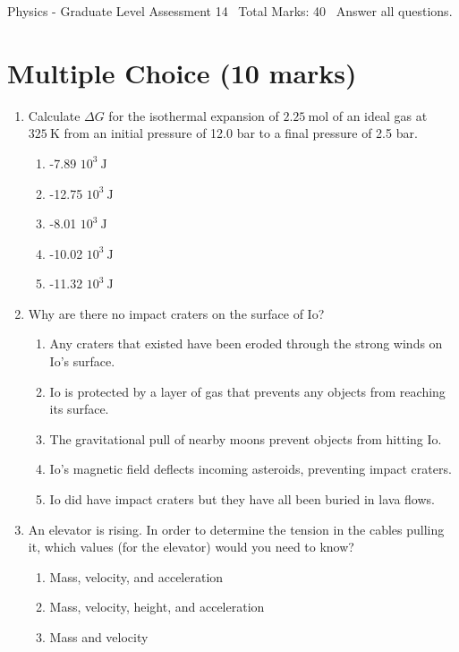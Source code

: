 \documentclass[12pt]{article}
\begin{document}
\begin{center}
Physics - Graduate Level Assessment 14 \
Total Marks: 40 \
Answer all questions.
\end{center}

\section*{Multiple Choice (10 marks)}
\begin{enumerate}[label=\arabic*.]
\item Calculate $\Delta G$ for the isothermal expansion of $2.25 \mathrm{~mol}$ of an ideal gas at $325 \mathrm{~K}$ from an initial pressure of 12.0 bar to a final pressure of 2.5 bar.
\begin{enumerate}[label=(\alph*)]
    \item -7.89 $10^3 \mathrm{~J}$
    \item -12.75 $10^3 \mathrm{~J}$
    \item -8.01 $10^3 \mathrm{~J}$
    \item -10.02 $10^3 \mathrm{~J}$
    \item -11.32 $10^3 \mathrm{~J}$
\end{enumerate}
\item Why are there no impact craters on the surface of Io?
\begin{enumerate}[label=(\alph*)]
    \item Any craters that existed have been eroded through the strong winds on Io's surface.
    \item Io is protected by a layer of gas that prevents any objects from reaching its surface.
    \item The gravitational pull of nearby moons prevent objects from hitting Io.
    \item Io's magnetic field deflects incoming asteroids, preventing impact craters.
    \item Io did have impact craters but they have all been buried in lava flows.
\end{enumerate}
\item An elevator is rising. In order to determine the tension in the cables pulling it, which values (for the elevator) would you need to know?
\begin{enumerate}[label=(\alph*)]
    \item Mass, velocity, and acceleration
    \item Mass, velocity, height, and acceleration
    \item Mass and velocity

\end{enumerate}
\end{enumerate}
\end{document}
